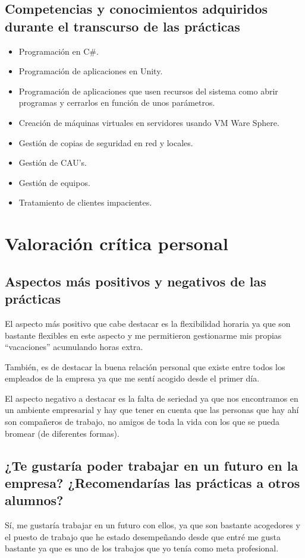 \documentclass[12pt,letterpaper]{article}
\begin{document}
\subsection{Competencias y conocimientos adquiridos durante el transcurso de las prácticas}
\begin{itemize}
	\item Programación en C\#.
	\item Programación de aplicaciones en Unity.
	\item Programación de aplicaciones que usen recursos del sistema como abrir programas y cerrarlos en función de unos parámetros.
	\item Creación de máquinas virtuales en servidores usando VM Ware Sphere.
	\item Gestión de copias de seguridad en red y locales.
	\item Gestión de CAU's.
	\item Gestión de equipos.
	\item Tratamiento de clientes impacientes.
\end{itemize}

\section{Valoración crítica personal}
\subsection{Aspectos más positivos y negativos de las prácticas}
El aspecto más positivo que cabe destacar es la flexibilidad horaria ya que son bastante flexibles en este aspecto y me permitieron gestionarme mis propias ``vacaciones'' acumulando horas extra.

También, es de destacar la buena relación personal que existe entre todos los empleados de la empresa ya que me sentí acogido desde el primer día.

El aspecto negativo a destacar es la falta de seriedad ya que nos encontramos en un ambiente empresarial y hay que tener en cuenta que las personas que hay ahí son compañeros de trabajo, no amigos de toda la vida con los que se pueda bromear (de diferentes formas).

\subsection{¿Te gustaría poder trabajar en un futuro en la empresa? ¿Recomendarías las prácticas a otros alumnos?}
Sí, me gustaría trabajar en un futuro con ellos, ya que son bastante acogedores y el puesto de trabajo que he estado desempeñando desde que entré me gusta bastante ya que es uno de los trabajos que yo tenía como meta profesional.
\end{document}
